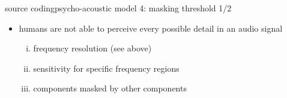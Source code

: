 	\begin{frame}{source coding}{psycho-acoustic model 4: masking threshold 1/2}
        \begin{itemize}
            \item   humans are not able to perceive every possible detail in an audio signal
                \begin{enumerate}[(i)]
                    \item<1->   frequency resolution (see above)
                    \item<1->   sensitivity for specific frequency regions
                    \item<2->   components masked by other components
\end{enumerate}
\end{itemize}
\end{frame}
